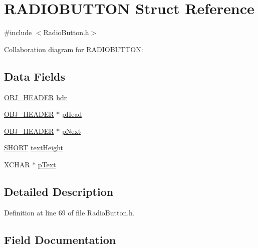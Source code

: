 \hypertarget{struct_r_a_d_i_o_b_u_t_t_o_n}{}\section{R\+A\+D\+I\+O\+B\+U\+T\+T\+O\+N Struct Reference}
\label{struct_r_a_d_i_o_b_u_t_t_o_n}


{\ttfamily \#include $<$Radio\+Button.\+h$>$}



Collaboration diagram for R\+A\+D\+I\+O\+B\+U\+T\+T\+O\+N\+:
\subsection*{Data Fields}
\begin{DoxyCompactItemize}
\item 
\hyperlink{struct_o_b_j___h_e_a_d_e_r}{O\+B\+J\+\_\+\+H\+E\+A\+D\+E\+R} \hyperlink{struct_r_a_d_i_o_b_u_t_t_o_n_abeffaf353197a8a64fba6707b68ce0be}{hdr}
\item 
\hyperlink{struct_o_b_j___h_e_a_d_e_r}{O\+B\+J\+\_\+\+H\+E\+A\+D\+E\+R} $\ast$ \hyperlink{struct_r_a_d_i_o_b_u_t_t_o_n_a55939b8f12cd7f69b5f7e06b5ec51d76}{p\+Head}
\item 
\hyperlink{struct_o_b_j___h_e_a_d_e_r}{O\+B\+J\+\_\+\+H\+E\+A\+D\+E\+R} $\ast$ \hyperlink{struct_r_a_d_i_o_b_u_t_t_o_n_ab37e3ec7793b9af61e3d3b35f3986fec}{p\+Next}
\item 
\hyperlink{_generic_type_defs_8h_ae9bb25d3afecf3bfab0fbe3c22c2050f}{S\+H\+O\+R\+T} \hyperlink{struct_r_a_d_i_o_b_u_t_t_o_n_a40fa9c35391b0005032180b85e7afd34}{text\+Height}
\item 
X\+C\+H\+A\+R $\ast$ \hyperlink{struct_r_a_d_i_o_b_u_t_t_o_n_a934b5563cdaf14803728ff3a7b7e8c7f}{p\+Text}
\end{DoxyCompactItemize}


\subsection{Detailed Description}


Definition at line 69 of file Radio\+Button.\+h.



\subsection{Field Documentation}
\hypertarget{struct_r_a_d_i_o_b_u_t_t_o_n_abeffaf353197a8a64fba6707b68ce0be}{}

